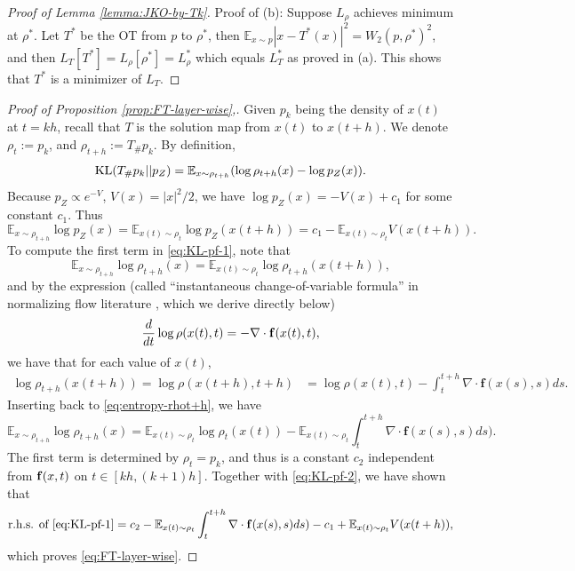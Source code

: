 \documentclass{article}
\theoremstyle{remark}
\theoremstyle{plain}
\newcommand{\E}{\mathbb{E}}
\begin{document}
{\begin{proof}[Proof of Lemma \ref{lemma:JKO-by-Tk}]
Proof of (b): Suppose $L_\rho$  achieves minimum at $\rho^*$. Let $T^*$ be the OT from $p$  to $\rho^*$, then $\E_{x \sim p} |x-T^*(x)|^2 = W_2(p, \rho^*)^2$, and then $L_T[T^*] = L_\rho[ \rho^* ] = L_\rho^*$ which equals $L_T^*$ as proved in (a). This shows that $T^*$ is a minimizer of $L_T$. 
\end{proof}



%
\begin{proof}[Proof of Proposition \ref{prop:FT-layer-wise},]
Given $p_k $ being the density of $x(t)$ at $t = k h$, recall that $T$ is the solution map from $x(t)$ to $x(t+h)$.
We denote $\rho_t:= p_k$, and $\rho_{t+h} := T_\# p_k$. By definition,
\begin{equation}\label{eq:KL-pf-1}
{\rm KL}(  T_\# p_k || p_Z)
= \E_{x\sim \rho_{t+h}} (  \log {\rho}_{t+h}(x)  -   \log p_Z(x) ).
\end{equation}
Because $p_Z \propto e^{-V}$, $V(x)= {|x|^{2}}/{2}$, 
we have $ \log p_Z (x)= -V (x)+ c_1$ for some constant $c_1$. 
Thus
\begin{equation}\label{eq:KL-pf-2}
\E_{ x \sim \rho_{t+h}} \log p_Z(x) = 
\E_{x(t) \sim \rho_t} \log p_Z (x(t+h)) =  c_1 - \E_{x(t) \sim \rho_t}  V( x(t+h)).
\end{equation}
To compute the first term in \eqref{eq:KL-pf-1}, note that
\begin{equation}\label{eq:entropy-rhot+h}
\E_{x \sim \rho_{t+h}} \log   \rho_{t+h}(x) 
 =  \E_{x(t) \sim \rho_{t}} \log   \rho_{t+h}(x (t+h)),
\end{equation}
and by the expression {(called ``instantaneous change-of-variable formula'' in normalizing flow literature \citep{chen2018neural},
which we derive directly below)}
\begin{equation}\label{eq:ddtlogrho(x(t),t)}
{\frac{d}{dt}} \log \rho( x(t), t) = - \nabla \cdot {\bf f}( x(t), t), 
\end{equation}
we have that for each value of $x(t)$,
\begin{align*}
\log \rho_{t+h}(x (t+h))= 
\log\rho(x(t+h),t+h) & =\log \rho(x(t),t) - \int_{t}^{t+h}\nabla\cdot\mathbf{f}(x (s),s)ds.
\end{align*}
Inserting back to \eqref{eq:entropy-rhot+h}, we have
\[
\E_{x \sim \rho_{t+h}} \log   \rho_{t+h}(x) 
 =  \E_{x(t) \sim \rho_{t}}  \log \rho_t(x(t)) 
  -  \E_{x(t) \sim \rho_{t}}  \int_{t}^{t+h}\nabla\cdot\mathbf{f}(x (s),s)ds).
\]
The first term is determined by $\rho_t = p_k$, 
and thus is a constant $c_2$ independent from  ${\bf f}(x ,t)$ on $t \in [kh, (k+1) h]$.
Together with \eqref{eq:KL-pf-2}, we have shown that 
\[
\text{r.h.s. of \eqref{eq:KL-pf-1}}
=c_2 -  \E_{x(t) \sim \rho_{t}}  \int_{t}^{t+h}\nabla\cdot\mathbf{f}(x (s),s)ds)
 - c_1 + \E_{x(t) \sim \rho_t}  V( x(t+h)),
\]
which proves \eqref{eq:FT-layer-wise}.


\end{proof}}
\end{document}
